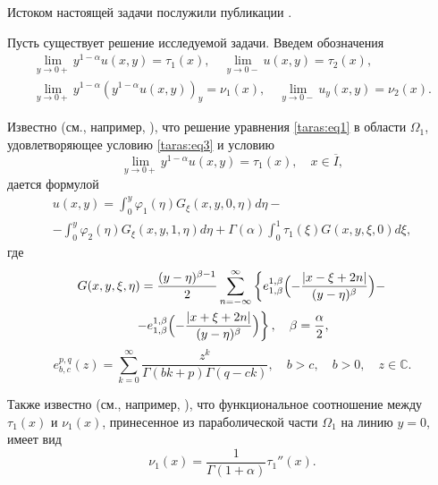 Истоком настоящей задачи послужили публикации \cite{taras:3, taras:4}.

\bigskip
{}
Пусть существует решение исследуемой задачи. Введем обозначения
\begin{gather}
       \label{taras:eq15}
\lim_{y \to 0+} y^{1-\alpha} u(x,y) = \tau_{1}(x), \quad \lim_{y \to 0-} u(x,y)= \tau_{2}(x),
\\
       \label{taras:eq16}
\lim_{y \to 0+} y^{1-\alpha} \left( y^{1-\alpha}  u(x,y) \right)_{y} = \nu_{1}(x), \quad \lim_{y \to 0-} u_{y}(x,y) =\nu_{2}(x).
\end{gather}

Известно (см., например, \cite{taras:5, taras:6}), что решение уравнения \eqref{taras:eq1} в области $\Omega_{1}$, удовлетворяющее условию \eqref{taras:eq3} и условию
\begin{equation}
       \label{taras:eq17}
\lim_{y \to 0+} y^{1-\alpha} u(x,y) = \tau_{1}(x), \quad x \in \overline{I},
\end{equation}
дается формулой
\begin{multline}
\label{taras:eq18}
 u(x,y) = \int _{0}^{y} \varphi_{1} (\eta) G_{\xi} (x, y, 0, \eta)  d \eta  - 
 \\
- \int _{0}^{y} \varphi_{2} (\eta) G_{\xi} (x, y, 1, \eta)  d \eta +
\Gamma (\alpha) \int _{0}^{1} \tau_{1}( \xi) G(x, y, \xi, 0)  d \xi ,
\end{multline}
где
\begin{multline}
\label{taras:eq19}
G(x,y, \xi, \eta) = \frac{(y- \eta)^{\beta-1}}{2} 
\sum_{n=- \infty}^{ \infty} 
\left\{ e_{1, \beta}^{1, \beta} 
\Bigl( - \frac{|x- \xi +2n|}{(y- \eta)^{\beta}} \Bigr) - \right.
\\
\left.
- e_{1, \beta}^{1, \beta} \Bigl( - \frac{|x+ \xi +2n|}{(y- \eta)^{\beta}} \Bigr) \right\}, 
\quad \beta = \frac{\alpha}{2},
\end{multline}
\[
e_{b, c}^{p, q}(z)= \sum_{k=0}^{ \infty} \frac{z^{k}}{ \Gamma(bk+p) \Gamma(q-ck)}, \quad b>c, \quad b>0, \quad z \in \mathbb C.
\]

Также известно (см., например, \cite{taras:5}), что функциональное соотношение между $\tau_{1}(x)$ и $\nu_{1}(x)$, принесенное из параболической части $\Omega_{1}$ на линию $y=0$, имеет вид
\begin{equation}
\label{taras:eq20}
\nu_{1}(x) = \frac{1}{ \Gamma(1+ \alpha)} \tau_{1}''(x).
\end{equation}


